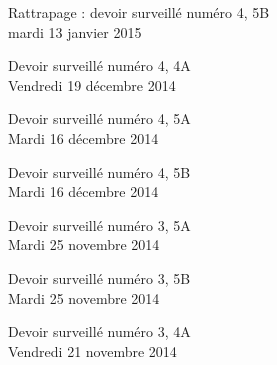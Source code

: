 \documentclass[a4paper,10pt]{article}
\begin{document}
\begin{feuilleDS}{Rattrapage : devoir surveillé numéro 4, 5B\\ \small mardi 13 janvier 2015}
\end{feuilleDS}


\begin{feuilleDS}{Devoir surveillé numéro 4, 4A\\ \small Vendredi 19 décembre 2014}

\end{feuilleDS}


\begin{feuilleDS}{Devoir surveillé numéro 4, 5A\\ \small Mardi 16 décembre 2014}
\end{feuilleDS}

\begin{feuilleDS}{Devoir surveillé numéro 4, 5B\\ \small Mardi 16 décembre 2014}
\end{feuilleDS}


\begin{feuilleDS}{Devoir surveillé numéro 3, 5A\\ \small Mardi 25 novembre 2014}
\end{feuilleDS}

\begin{feuilleDS}{Devoir surveillé numéro 3, 5B\\ \small Mardi 25 novembre 2014}
\end{feuilleDS}

\begin{feuilleDS}{Devoir surveillé numéro 3, 4A\\ \small Vendredi 21 novembre 2014}
\end{feuilleDS}
\end{document}
